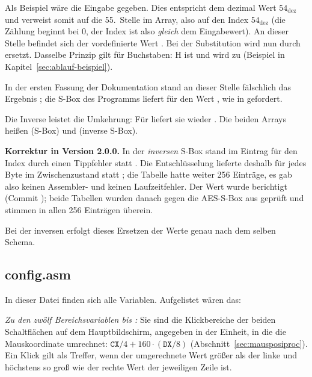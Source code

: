 Als Beispiel wäre die Eingabe  gegeben. Dies entspricht dem dezimal Wert $54_{\text{dez}}$ und verweist somit auf die 55.\ Stelle im Array, also auf den Index $54_{\text{dez}}$ (die Zählung beginnt bei 0, der Index ist also \emph{gleich} dem Eingabewert). An dieser Stelle befindet sich der vordefinierte Wert . Bei der Substitution wird nun  durch  ersetzt. Dasselbe Prinzip gilt für Buchstaben: \glqq H\grqq{} ist  und wird zu  (Beispiel in Kapitel~\ref{sec:ablauf-beispiel}).

In der ersten Fassung der Dokumentation stand an dieser Stelle fälschlich das Ergebnis ; die S-Box des Programms liefert für  den Wert , wie in \cite{fips197} gefordert.

Die Inverse leistet die Umkehrung: Für  liefert sie wieder . Die beiden Arrays heißen  (S-Box) und  (inverse S-Box).

\textbf{Korrektur in Version 2.0.0.} In der \emph{inversen} S-Box  stand im Eintrag für den Index  durch einen Tippfehler  statt . Die Entschlüsselung lieferte deshalb für jedes Byte  im Zwischenzustand  statt ; die Tabelle hatte weiter 256 Einträge, es gab also keinen Assembler- und keinen Laufzeitfehler. Der Wert wurde berichtigt (Commit ); beide Tabellen wurden danach gegen die AES-S-Box aus \cite{fips197} geprüft und stimmen in allen 256 Einträgen überein.

Bei der inversen  erfolgt dieses Ersetzen der Werte genau nach dem selben Schema.

\subsection{config.asm}
In dieser Datei finden sich alle Variablen. Aufgelistet wären das:

\emph{Zu den zwölf Bereichsvariablen  bis :} Sie sind die Klickbereiche der beiden Schaltflächen auf dem Hauptbildschirm, angegeben in der Einheit, in die  die Mauskoordinate umrechnet: $\mathtt{CX}/4+160\cdot(\mathtt{DX}/8)$ (Abschnitt~\ref{sec:mausposiproc}). Ein Klick gilt als Treffer, wenn der umgerechnete Wert größer als der linke und höchstens so groß wie der rechte Wert der jeweiligen Zeile ist.

